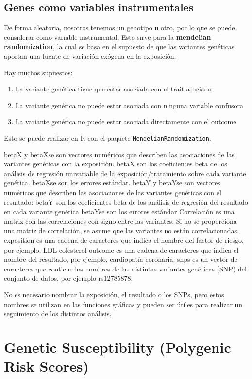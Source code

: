 \section{Genes como variables instrumentales}
De forma aleatoria, nosotros tenemos un genotipo u otro, por lo que se puede considerar como variable instrumental. Esto sirve para la \textbf{mendelian randomization}, la cual se basa en el supuesto de que las variantes genéticas aportan una fuente de variación exógena en la exposición.

Hay muchos supuestos:
\begin{enumerate}
\item La variante genética tiene que estar asociada con el trait asociado
\item La variante genética no puede estar asociada con ninguna variable confusora
\item La variante genética no puede estar asociada directamente con el outcome
\end{enumerate}

Esto se puede realizar en R con el paquete \texttt{MendelianRandomization}.

betaX y betaXse son vectores numéricos que describen las asociaciones de las variantes genéticas con la exposición. 
betaX son los coeficientes beta de los análisis de regresión univariable de la exposición/tratamiento sobre cada variante genética. 
betaXse son los errores estándar.
betaY y betaYse son vectores numéricos que describen las asociaciones de las variantes genéticas con el resultado: 
betaY son los coeficientes beta de los análisis de regresión del resultado en cada variante genética 
betaYse son los errores estándar
Correlación es una matriz con las correlaciones con signo entre las variantes. Si no se proporciona una matriz de correlación, se asume que las variantes no están correlacionadas.
exposition es una cadena de caracteres que indica el nombre del factor de riesgo, por ejemplo, LDL-colesterol
outcome es una cadena de caracteres que indica el nombre del resultado, por ejemplo, cardiopatía coronaria. 
snps es un vector de caracteres que contiene los nombres de las distintas variantes genéticas (SNP) del conjunto de datos, por ejemplo rs12785878. 

No es necesario nombrar la exposición, el resultado o los SNPs, pero estos nombres se utilizan en las funciones gráficas y pueden ser útiles para realizar un seguimiento de los distintos análisis.

\chapter{Genetic Susceptibility (Polygenic Risk Scores)}
